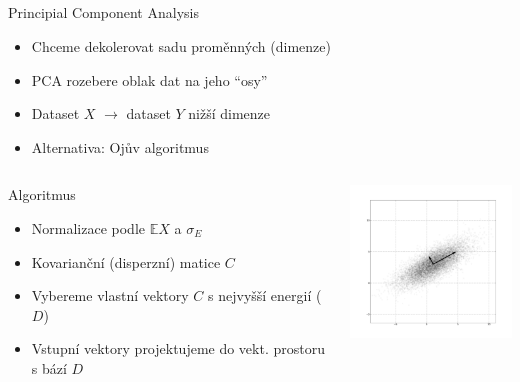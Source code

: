 \documentclass{beamer}
\begin{document}
\subsection{}
\begin{frame}{Principial Component Analysis}
\begin{itemize}
\item Chceme dekolerovat sadu proměnných (dimenze)
\item PCA rozebere oblak dat na jeho ``osy''
\item Dataset $X$ $\to$ dataset $Y$ nižší dimenze
\item Alternativa: Ojův algoritmus
\end{itemize}

\begin{columns}
\begin{column}{6cm}
\begin{block}{Algoritmus}
\begin{itemize}
\item Normalizace podle $\mathbb{E}X$ a $\sigma_E$
\item Kovarianční (disperzní) matice $C$
\item Vybereme vlastní vektory $C$ s nejvyšší energií ($D$)
\item Vstupní vektory projektujeme do vekt. prostoru s bází $D$
\end{itemize}
\end{block}
\end{column}
\begin{column}{5cm}
\includegraphics[width=5cm]{GaussianScatterPCA.png}
\end{column}
\end{columns}
\end{frame}
\end{document}
